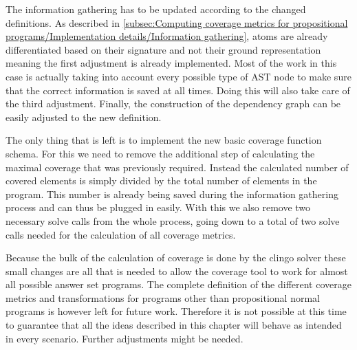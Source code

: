 The information gathering has to be updated according to the changed definitions. As described in \cref{subsec:Computing coverage metrics for propositional programs/Implementation details/Information gathering}, atoms are already differentiated based on their signature and not their ground representation meaning the first adjustment is already implemented. Most of the work in this case is actually taking into account every possible type of AST node to make sure that the correct information is saved at all times. Doing this will also take care of the third adjustment. Finally, the construction of the dependency graph can be easily adjusted to the new definition.

The only thing that is left is to implement the new basic coverage function schema. For this we need to remove the additional step of calculating the maximal coverage that was previously required. Instead the calculated number of covered elements is simply divided by the total number of elements in the program. This number is already being saved during the information gathering process and can thus be plugged in easily. With this we also remove two necessary solve calls from the whole process, going down to a total of two solve calls needed for the calculation of all coverage metrics.

Because the bulk of the calculation of coverage is done by the clingo solver these small changes are all that is needed to allow the coverage tool to work for almost all possible answer set programs. The complete definition of the different coverage metrics and transformations for programs other than propositional normal programs is however left for future work. Therefore it is not possible at this time to guarantee that all the ideas described in this chapter will behave as intended in every scenario. Further adjustments might be needed.
 

\begin{comment}
- explain how the transformations I introduced already do basically everything that was proposed in previous section -> go through one by one?

- example?
\end{comment}


